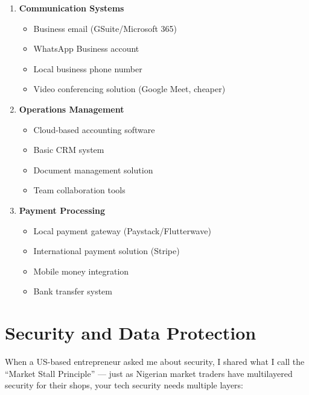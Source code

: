 \begin{tcolorbox}[colback=white,colframe=primarydark,title=\textbf{Essential Systems Framework}]
\begin{enumerate}
    \item \textbf{Communication Systems}
    \begin{itemize}
        \item Business email (GSuite/Microsoft 365)
        \item WhatsApp Business account
        \item Local business phone number
        \item Video conferencing solution (Google Meet, cheaper)
    \end{itemize}

    \item \textbf{Operations Management}
    \begin{itemize}
        \item Cloud-based accounting software
        \item Basic CRM system
        \item Document management solution
        \item Team collaboration tools
    \end{itemize}

    \item \textbf{Payment Processing}
    \begin{itemize}
        \item Local payment gateway (Paystack/Flutterwave)
        \item International payment solution (Stripe)
        \item Mobile money integration
        \item Bank transfer system
    \end{itemize}
\end{enumerate}
\end{tcolorbox}

\section{Security and Data Protection}\label{sec:security-data}

When a US-based entrepreneur asked me about security, I shared what I call the ``Market Stall Principle'' --- just as Nigerian market traders have multilayered security for their shops, your tech security needs multiple layers:

